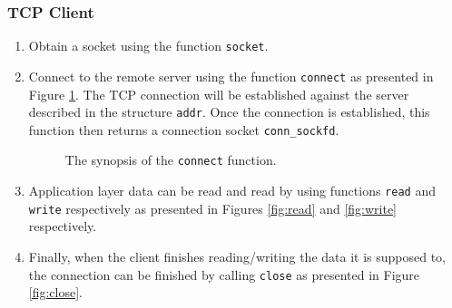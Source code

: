 \documentclass[pdftex,12pt,a4paper]{article}
\begin{document}
            \subsubsection{TCP Client}
                \begin{enumerate}
                    \item Obtain a socket using the function \texttt{socket}.
                    \item Connect to the remote server using the function
                        \texttt{connect} as presented in Figure
                        \ref{fig:connect}. The TCP connection will be
                        established against the server described in the
                        structure \texttt{addr}. Once the connection is
                        established, this function then returns a
                        connection socket \texttt{conn\_sockfd}.
                        \begin{figure}[tbh]
                            \centering
                            
                            \caption{The synopsis of the \texttt{connect} function.}
                            \label{fig:connect}
                        \end{figure}
                    \item Application layer data can be read and read by using
                        functions \texttt{read} and \texttt{write} respectively
                        as presented in Figures \ref{fig:read} and
                        \ref{fig:write} respectively.
                    \item Finally, when the client finishes reading/writing the
                        data it is supposed to, the connection can be finished
                        by calling \texttt{close} as presented in Figure
                        \ref{fig:close}.
                \end{enumerate}
\end{document}
